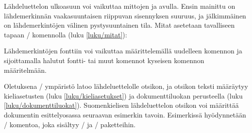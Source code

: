 
Lähdeluettelon ulkoasuun voi vaikuttaa mittojen  ja
 avulla. Ensin mainittu on lähdemerkinnän vaakasuuntaisen
riippuvan sisennyksen suuruus, ja jälkimmäinen on lähdemerkintöjen
välinen pystysuuntainen tila. Mitat asetetaan tavalliseen tapaan
\-/ komennolla (luku \ref{luku/mitat}):

\begin{koodilohkosis}
\setlength{\parindent}{1.1em} %
\setlength{\bibhang}{\parindent}
\setlength{\bibsep}{.5ex plus .1ex minus .1ex}
\end{koodilohkosis}

Lähdemerkintöjen fonttiin voi vaikuttaa määrittelemällä uudelleen
komennon  ja sijoittamalla halutut fontti- tai muut
komennot kyseisen komennon määritelmään.

\begin{koodilohkosis}
\renewcommand{\bibfont}{\sffamily\small}
\end{koodilohkosis}

Oletuksena \-/ ympäristö latoo
lähdeluettelolle otsikon, ja otsikon teksti määräytyy kieliasetusten
(luku \ref{luku/kieliasetukset}) ja dokumenttiluokan perusteella (luku
\ref{luku/dokumenttiluokat}). Suomenkielisen lähdeluettelon otsikon voi
määrittää dokumentin esittelyosassa seuraavan esimerkin tavoin.
Esimerkissä hyödynnetään \-/ komentoa, joka sisältyy
\-/{} ja \-/ paketteihin.

